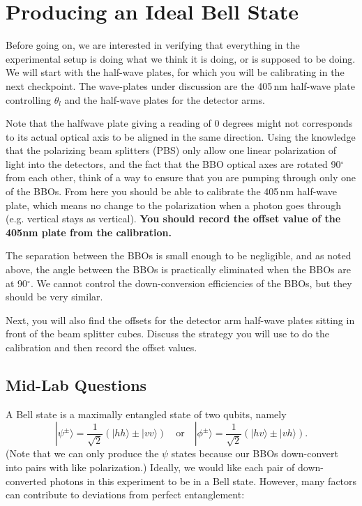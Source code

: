 \documentclass{../lab}
\begin{document}
\section{Producing an Ideal Bell State}
    Before going on, we are interested in verifying that everything in the experimental setup is doing what we think it is doing, or is supposed to be doing. We will start with the half-wave plates, for which you will be calibrating in the next checkpoint. The wave-plates under discussion are the 405\,nm half-wave plate controlling $\theta_l$ and the half-wave plates for the detector arms.

    Note that the halfwave plate giving a reading of 0 degrees might not corresponds to its actual optical axis to be aligned in the same direction. Using the knowledge that the polarizing beam splitters (PBS) only allow one linear polarization of light into the detectors, and the fact that the BBO optical axes are rotated 90$^\circ$ from each other, think of a way to ensure that you are pumping through only one of the BBOs. From here you should be able to calibrate the 405\,nm half-wave plate, which means no change to the polarization when a photon goes through (e.g. vertical stays as vertical). \textbf{You should record the offset value of the 405nm plate from the calibration.}

    The separation between the BBOs is small enough to be negligible, and as noted above, the angle between the BBOs is practically eliminated when the BBOs are at 90$^\circ$. We cannot control the down-conversion efficiencies of the BBOs, but they should be very similar.

    Next, you will also find the offsets for the detector arm half-wave plates sitting in front of the beam splitter cubes. Discuss the strategy you will use to do the calibration and then record the offset values.



\subsection{Mid-Lab Questions}

A Bell state is a maximally entangled state of two qubits, namely
\begin{equation}
    |\psi^\pm\rangle = \frac{1}{\sqrt{2}}(|hh\rangle \pm |vv\rangle)
    \quad \text{or} \quad
    |\phi^\pm\rangle = \frac{1}{\sqrt{2}}(|hv\rangle \pm |vh\rangle).
\end{equation}
(Note that we can only produce the $\psi$ states because our BBOs down-convert into pairs with like polarization.) Ideally, we would like each pair of down-converted photons in this experiment to be in a Bell state. However, many factors can contribute to deviations from perfect entanglement:
\end{document}
